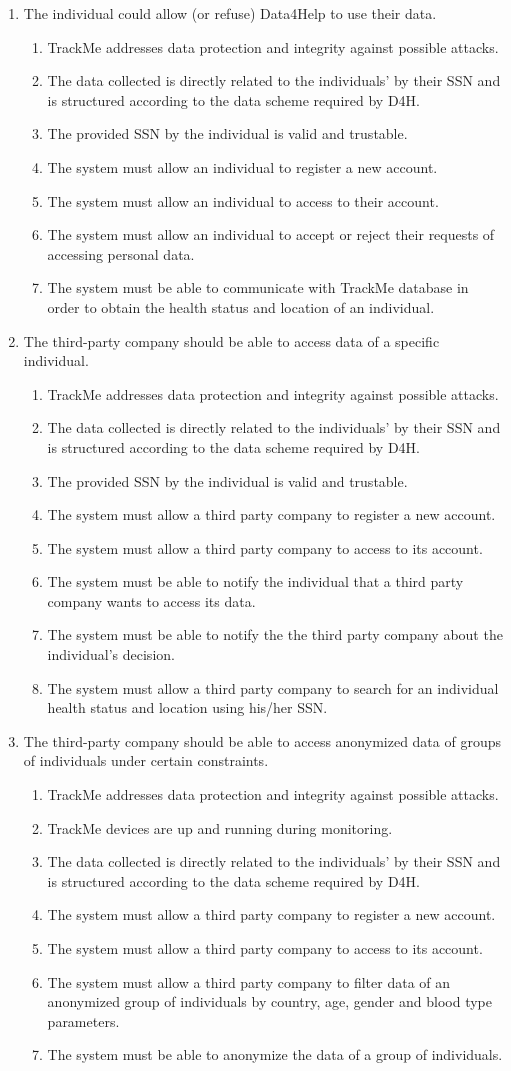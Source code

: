 \documentclass[hidelinks, 12pt]{report}
\newcommand\requirement[1]{\item[{[R#1]}] }
\newcommand\goal[1]{\item[{[G#1]}] }
\newcommand\assumption[1]{\item[{[D#1]}] }
\begin{document}
	\begin{enumerate}
		\goal{1} The individual could allow (or refuse) Data4Help to use their data.
		\begin{enumerate}
			\assumption{2} TrackMe addresses data protection and integrity against possible attacks.
			\assumption{4} The data collected is directly related to the individuals' by their SSN and is structured according to the data scheme required by D4H.
			\assumption{5} The provided SSN by the individual is valid and trustable.
			\requirement{1} The system must allow an individual to register a new account.
			\requirement{2} The system must allow an individual to access to their account.
			\requirement{3} The system must allow an individual to accept or reject their requests of accessing personal data.
			\requirement{4} The system must be able to communicate with TrackMe database in order to obtain the health status and location of an individual.
		\end{enumerate}
		
		\goal{2} The third-party company should be able to access data of a specific individual.
		\begin{enumerate}
			\assumption{2} TrackMe addresses data protection and integrity against possible attacks.
			\assumption{4} The data collected is directly related to the individuals' by their SSN and is structured according to the data scheme required by D4H.
			\assumption{5} The provided SSN by the individual is valid and trustable.
			\requirement{5} The system must allow a third party company to register a new account.
			\requirement{6} The system must allow a third party company to access to its account.
			\requirement{7} The system must be able to notify the individual that a third party company wants to access its data.
			\requirement{7.1} The system must be able to notify the the third party company about the individual's decision.
			\requirement{8} The system must allow a third party company to search for an individual health status and location using his/her SSN.
		\end{enumerate}
		
		\goal{3} The third-party company should be able to access anonymized data of groups of individuals under certain constraints.
		\begin{enumerate}
			\assumption{2} TrackMe addresses data protection and integrity against possible attacks.
			\assumption{3} TrackMe devices are up and running during monitoring.
			\assumption{4} The data collected is directly related to the individuals' by their SSN and is structured according to the data scheme required by D4H.
			\requirement{5} The system must allow a third party company to register a new account.
			\requirement{6} The system must allow a third party company to access to its account.
			\requirement{9} The system must allow a third party company to filter data of an anonymized group of individuals by country, age, gender and blood type parameters.
			\requirement{10} The system must be able to anonymize the data of a group of individuals.
		\end{enumerate}
		

\end{enumerate}
\end{document}
